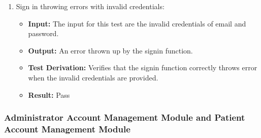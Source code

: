 \documentclass[12pt, titlepage]{article}
\begin{document}
\begin{enumerate}
    \item Sign in throwing errors with invalid credentials:
      \begin{itemize}
        \item \textbf{Input:} The input for this test are the invalid credentials of email and password. 
        \item \textbf{Output:} An error thrown up by the signin function.
        \item \textbf{Test Derivation:} Verifies that the signin function correctly throws error when the invalid credentials are provided.
        \item \textbf{Result:} Pass 
      \end{itemize}
  \end{enumerate}


\subsubsection{Administrator Account Management Module and Patient Account Management Module}
\end{document}
